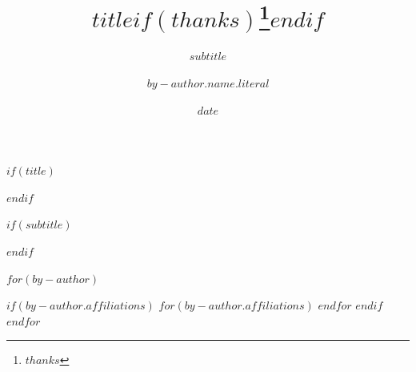 $if(title)$
  \title{$title$$if(thanks)$\thanks{$thanks$}$endif$}
$endif$
  
  $if(subtitle)$
  \subtitle{$subtitle$}
$endif$
  
  $for(by-author)$
  \author{$by-author.name.literal$}
$if(by-author.affiliations)$
  $for(by-author.affiliations)$
$endfor$
  $endif$
  $endfor$
  
  \date{$date$}